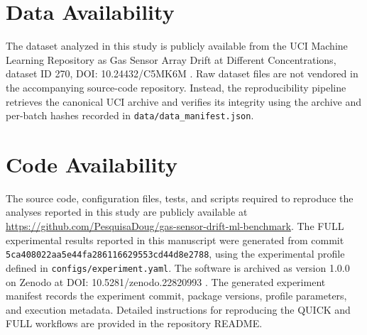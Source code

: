 \documentclass[conference]{IEEEtran}
\begin{document}
\section{Data Availability}
The dataset analyzed in this study is publicly available from the UCI Machine Learning Repository as Gas Sensor Array Drift at Different Concentrations, dataset ID 270, DOI: 10.24432/C5MK6M \cite{uci_gas_270}. Raw dataset files are not vendored in the accompanying source-code repository. Instead, the reproducibility pipeline retrieves the canonical UCI archive and verifies its integrity using the archive and per-batch hashes recorded in \texttt{data/data\_manifest.json}.

\section{Code Availability}
The source code, configuration files, tests, and scripts required to reproduce the analyses reported in this study are publicly available at \url{https://github.com/PesquisaDoug/gas-sensor-drift-ml-benchmark}. The FULL experimental results reported in this manuscript were generated from commit \texttt{5ca408022aa5e44fa286116629553cd44d8e2788}, using the experimental profile defined in \texttt{configs/experiment.yaml}. The software is archived as version 1.0.0 on Zenodo at DOI: 10.5281/zenodo.22820993 \cite{delimasilva2026software}. The generated experiment manifest records the experiment commit, package versions, profile parameters, and execution metadata. Detailed instructions for reproducing the QUICK and FULL workflows are provided in the repository README.



\end{document}
